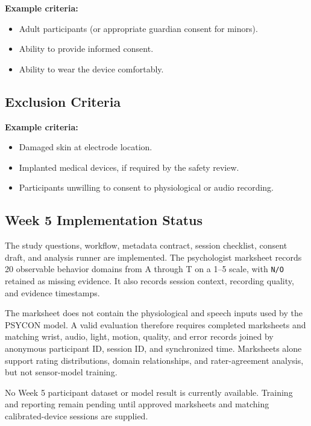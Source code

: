 \textbf{Example criteria:}
\begin{itemize}
    \item Adult participants (or appropriate guardian consent for minors).
    \item Ability to provide informed consent.
    \item Ability to wear the device comfortably.
\end{itemize}

\subsection{Exclusion Criteria}
\label{sec:exclusion-criteria}

\textbf{Example criteria:}
\begin{itemize}
    \item Damaged skin at electrode location.
    \item Implanted medical devices, if required by the safety review.
    \item Participants unwilling to consent to physiological or audio recording.
\end{itemize}

\subsection{Week 5 Implementation Status}
\label{sec:week5-research-status}

The study questions, workflow, metadata contract, session checklist, consent draft, and analysis runner are implemented. The psychologist marksheet records 20 observable behavior domains from A through T on a 1--5 scale, with \texttt{N/O} retained as missing evidence. It also records session context, recording quality, and evidence timestamps.

The marksheet does not contain the physiological and speech inputs used by the PSYCON model. A valid evaluation therefore requires completed marksheets and matching wrist, audio, light, motion, quality, and error records joined by anonymous participant ID, session ID, and synchronized time. Marksheets alone support rating distributions, domain relationships, and rater-agreement analysis, but not sensor-model training.

\begin{validationbox}
No Week 5 participant dataset or model result is currently available. Training and reporting remain pending until approved marksheets and matching calibrated-device sessions are supplied.
\end{validationbox}
